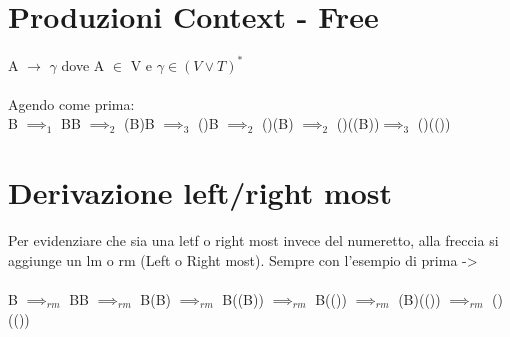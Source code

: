 \documentclass[12pt, a4paper, openany, oneside]{book}
\begin{document}
\section{Produzioni Context - Free}
A $\to$ $\gamma$ dove A $\in$ V e $\gamma \in (V\vee T)^{*}$ \\ \\
Agendo come prima:	\\
B $\implies _{1}$ BB $\implies _{2}$ (B)B $\implies _{3}$ ()B $\implies _{2}$ 
()(B) $\implies _{2}$ ()((B))$\implies _{3}$ ()(())
\section{Derivazione left/right most}
Per evidenziare che sia una letf o right most invece del numeretto, alla freccia
si aggiunge un lm o rm (Left o Right most). Sempre con l'esempio di prima -> \\ \\
B $\implies _{rm}$ BB $\implies _{rm}$ B(B) $\implies _{rm}$ B((B)) 
$\implies _{rm}$ B(()) $\implies _{rm}$ (B)(()) $\implies _{rm}$ ()(())
\end{document}
